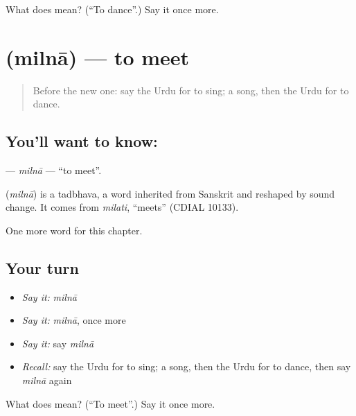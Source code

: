 \begin{tcolorbox}[breakable,colback=teal!4,colframe=teal!35!black,title={Before you move on}]
What does  mean? (\textquotedblleft{}To dance\textquotedblright{}.) Say it once more.
\end{tcolorbox}
\section[\texorpdfstring{\ur{ملنا} (milnā)}{ملنا (milnā)}]{ (milnā) — to meet}

\label{lesson:UR-C50-milna}



\begin{quote}
Before the new one: say the Urdu for to sing; a song, then the Urdu for to dance.
\end{quote}

\subsection*{You'll want to know: }
\textbf{} — \emph{milnā} — \textquotedblleft{}to meet\textquotedblright{}.

\begin{cousinweb}
\textbf{} (\emph{milnā}) is a tadbhava, a word inherited from Sanskrit and reshaped by sound change. It comes from \emph{milati}, \textquotedblleft{}meets\textquotedblright{} (CDIAL 10133).
\end{cousinweb}

\begin{grammarlens}[title={What you've built}]
One more word for this chapter.
\end{grammarlens}

\subsection*{Your turn}
\begin{itemize}
\raggedright
  \item \emph{Say it:} \emph{milnā}
  \item \emph{Say it:} \emph{milnā}, once more
  \item \emph{Say it:} say \emph{milnā}
  \item \emph{Recall:} say the Urdu for to sing; a song, then the Urdu for to dance, then say \emph{milnā} again
\end{itemize}

\begin{tcolorbox}[breakable,colback=teal!4,colframe=teal!35!black,title={Before you move on}]
What does  mean? (\textquotedblleft{}To meet\textquotedblright{}.) Say it once more.
\end{tcolorbox}
